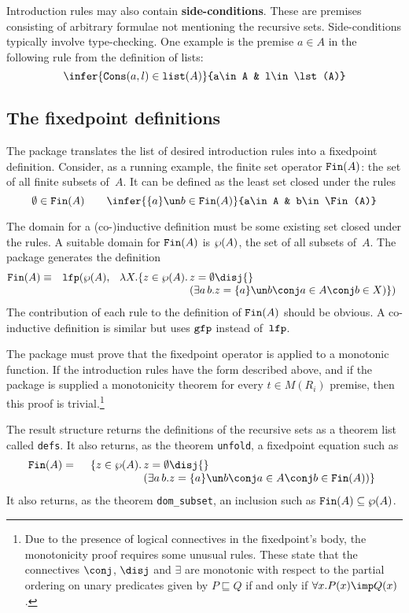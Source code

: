Introduction rules may also contain {\bf side-conditions}.  These are
premises consisting of arbitrary formulae not mentioning the recursive
sets. Side-conditions typically involve type-checking.  One example is the
premise $a\in A$ in the following rule from the definition of lists:
\[ \infer{\Cons(a,l)\in\lst(A)}{a\in A & l\in\lst(A)} \]

\subsection{The fixedpoint definitions}
The package translates the list of desired introduction rules into a fixedpoint
definition.  Consider, as a running example, the finite set operator
${\tt Fin}(A)$: the set of all finite subsets of~$A$.  It can be
defined as the least set closed under the rules
\[  \emptyset\in\Fin(A)  \qquad 
    \infer{\{a\}\un b\in\Fin(A)}{a\in A & b\in\Fin(A)} 
\]

The domain for a (co-)inductive definition must be some existing set closed
under the rules.  A suitable domain for ${\tt Fin}(A)$ is $\wp(A)$, the set of all
subsets of~$A$.  The package generates the definition
\begin{eqnarray*}
  \Fin(A) & \equiv &  \lfp(\pow(A), \;
  \begin{array}[t]{r@{\,}l}
      \lambda X. \{z\in\pow(A). & z=\emptyset \disj{} \\
                  &(\exists a\,b. z=\{a\}\un b\conj a\in A\conj b\in X)\})
  \end{array}
\end{eqnarray*}
The contribution of each rule to the definition of ${\tt Fin}(A)$ should be
obvious.  A co-inductive definition is similar but uses ${\tt gfp}$ instead
of~${\tt lfp}$.

The package must prove that the fixedpoint operator is applied to a
monotonic function.  If the introduction rules have the form described
above, and if the package is supplied a monotonicity theorem for every
$t\in M(R_i)$ premise, then this proof is trivial.\footnote{Due to the
  presence of logical connectives in the fixedpoint's body, the
  monotonicity proof requires some unusual rules.  These state that the
  connectives $\conj$, $\disj$ and $\exists$ are monotonic with respect to
  the partial ordering on unary predicates given by $P\sqsubseteq Q$ if and
  only if $\forall x.P(x)\imp Q(x)$.}

The result structure returns the definitions of the recursive sets as a theorem
list called {\tt defs}.  It also returns, as the theorem {\tt unfold}, a
fixedpoint equation such as 
\begin{eqnarray*}
  \Fin(A) & = &
  \begin{array}[t]{r@{\,}l}
     \{z\in\pow(A). & z=\emptyset \disj{} \\
             &(\exists a\,b. z=\{a\}\un b\conj a\in A\conj b\in \Fin(A))\}
  \end{array}
\end{eqnarray*}
It also returns, as the theorem {\tt dom\_subset}, an inclusion such as 
${\tt Fin}(A)\subseteq\wp(A)$.


